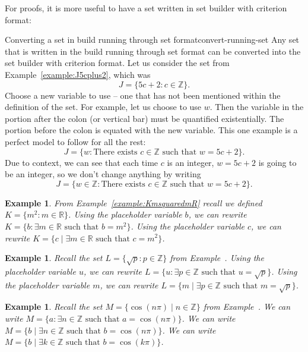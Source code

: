 \documentclass{book}
\newcounter{ekcounter}%
\theoremstyle{ekimcustom}
\newtheorem{example}[ekcounter]{Example}
\begin{document}
For proofs, it is more useful to have a set written in set builder with criterion format:
\begin{bmethod}{Converting a set in build running through set format}{convert-running-set}
Any set that is written in the build running through set format can be converted into the set builder with criterion format. Let us consider the set from Example~\ref{example:J5cplus2}, which was
\[ J = \{5c+2 : c \in \mathbb{Z}\}.\]
Choose a new variable to use -- one that has not been mentioned within the definition of the set. For example, let us choose to use $w$. Then the variable in the portion after the colon (or vertical bar) must be quantified existentially. The portion before the colon is equated with the new variable. This one example is a perfect model to follow for all the rest:
\[ J = \{w : \text{There exists } c \in \mathbb{Z} \text{ such that } w = 5c+2\}.\]
Due to context, we can see that each time $c$ is an integer, $w=5c+2$ is going to be an integer, so we don't change anything by writing
\[ J = \{w \in \mathbb{Z} : \text{There exists } c \in \mathbb{Z} \text{ such that } w = 5c+2\}.\]
\end{bmethod}

\begin{example}
From Example~\ref{example:KmsquaredmR} recall we defined $K = \{ m^2 : m \in \mathbb{R}\}$.
Using the placeholder variable $b$, we can rewrite $K = \{ b : \exists m \in \mathbb{R} \text{ such that } b = m^2\}$.
Using the placeholder variable $c$, we can rewrite $K = \{ c \mid \exists m \in \mathbb{R} \text{ such that } c = m^2\}$.
\end{example}
\begin{example}
Recall the set $L = \{ \sqrt{p} : p \in \mathbb{Z}\}$ from Example~\label{example:Lsqrtp-with-pinZ}.
Using the placeholder variable $u$, we can rewrite $L = \{u : \exists p \in \mathbb{Z} \text{ such that } u = \sqrt{p}\}$.
Using the placeholder variable $m$, we can rewrite $L = \{m \mid \exists p \in \mathbb{Z} \text{ such that } m = \sqrt{p}\}$.
\end{example}
\begin{example}
Recall the set $M = \{ \cos(n\pi) \mid n \in \mathbb{Z}\}$ from Example~\label{example:Mcosnpi}.
We can write $M = \{ a : \exists n \in \mathbb{Z} \text{ such that } a = \cos(n\pi)\}$.
We can write $M = \{ b \mid \exists n \in \mathbb{Z} \text{ such that } b = \cos(n\pi)\}$.
We can write $M = \{ b \mid \exists k \in \mathbb{Z} \text{ such that } b = \cos(k\pi)\}$.
\end{example}
\end{document}
